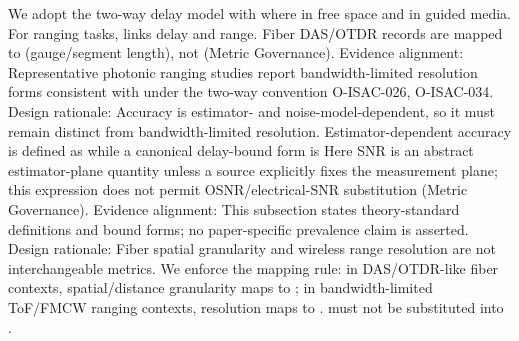 {}We adopt the two-way delay model with\markdownRendererSoftLineBreak
{}\markdownRendererSoftLineBreak
{}where  in free space and  in guided media. For ranging tasks,  links delay and range. Fiber DAS/OTDR records are mapped to  (gauge/segment length), not  (Metric Governance).\markdownRendererParagraphSeparator
{}Evidence alignment: Representative photonic ranging studies report bandwidth-limited resolution forms consistent with  under the two-way convention O-ISAC-026, O-ISAC-034.\markdownRendererInterblockSeparator
{}
\markdownRendererSectionEnd \markdownRendererSectionBegin
{}\markdownRendererInterblockSeparator
{}Design rationale: Accuracy is estimator- and noise-model-dependent, so it must remain distinct from bandwidth-limited resolution.\markdownRendererParagraphSeparator
{}Estimator-dependent accuracy is defined as\markdownRendererSoftLineBreak
{}\markdownRendererSoftLineBreak
{}while a canonical delay-bound form is\markdownRendererSoftLineBreak
{}\markdownRendererSoftLineBreak
{}Here SNR is an abstract estimator-plane quantity unless a source explicitly fixes the measurement plane; this expression does not permit OSNR/electrical-SNR substitution (Metric Governance).\markdownRendererParagraphSeparator
{}Evidence alignment: This subsection states theory-standard definitions and bound forms; no paper-specific prevalence claim is asserted.\markdownRendererInterblockSeparator
{}
\markdownRendererSectionEnd \markdownRendererSectionBegin
{}\markdownRendererInterblockSeparator
{}Design rationale: Fiber spatial granularity and wireless range resolution are not interchangeable metrics.\markdownRendererParagraphSeparator
{}We enforce the mapping rule: in DAS/OTDR-like fiber contexts, spatial/distance granularity maps to ; in bandwidth-limited ToF/FMCW ranging contexts, resolution maps to .   must not be substituted into .\markdownRendererParagraphSeparator
